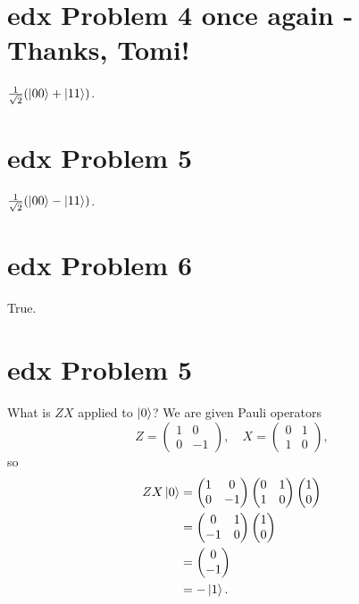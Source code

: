 \documentclass[10pt]{article}
\begin{document}
\section*{edx Problem 4 once again - Thanks, Tomi!}
$\frac{1}{\sqrt{2}} (\ket{00} + \ket{11})$.

\section*{edx Problem 5}
$\frac{1}{\sqrt{2}} (\ket{00} - \ket{11})$.

\section*{edx Problem 6}
True.

\section*{edx Problem 5}
What is $ZX$ applied to $\ket{0}$?
We are given Pauli operators
\[
Z = \begin{pmatrix}
1 & 0 \\
0 & -1 
\end{pmatrix}, \quad
X = \begin{pmatrix}
0 & 1 \\
1 & 0
\end{pmatrix},
\]
so 
\begin{align*}
ZX\ket{0} &= \begin{pmatrix}
1 & 0 \\
0 & -1
\end{pmatrix}
\begin{pmatrix}
0 & 1 \\
1 & 0
\end{pmatrix}
\begin{pmatrix}
1 \\
0
\end{pmatrix} \\
&= \begin{pmatrix}
0 & 1 \\
-1 & 0
\end{pmatrix}
\begin{pmatrix}
1 \\
0
\end{pmatrix} \\
&= \begin{pmatrix}
0 \\
-1
\end{pmatrix} \\
&= -\ket{1}.
\end{align*}
\end{document}
